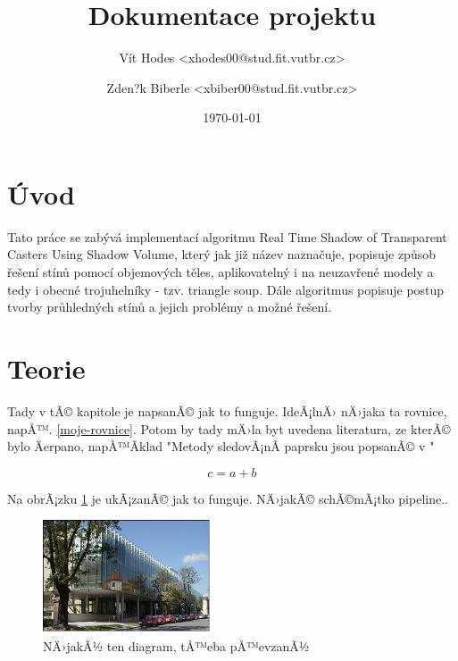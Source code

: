 \documentclass[a4paper, 12pt]{article}
\title{Dokumentace projektu}
\author{Vít Hodes <xhodes00@stud.fit.vutbr.cz>}
\author{Zden?k Biberle <xbiber00@stud.fit.vutbr.cz>}
\date{\today}
\begin{document}
\maketitle

\section{Úvod}


Tato práce se zabývá implementací algoritmu Real Time Shadow of Transparent Casters Using Shadow
Volume, který jak již název naznačuje, popisuje způsob řešení stínů pomocí objemových těles, aplikovatelný i
na neuzavřené modely a tedy i obecné trojuhelníky - tzv. triangle soup. Dále algoritmus popisuje
postup tvorby průhledných stínů a jejich problémy a možné řešení.


\section{Teorie}

Tady v tÃ© kapitole je napsanÃ© jak to funguje. IdeÃ¡lnÄ› nÄ›jaka ta rovnice, napÅ™. \ref{moje-rovnice}. Potom by
tady mÄ›la byt uvedena literatura, ze kterÃ© bylo Äerpano, napÅ™Ã­klad "Metody sledovÃ¡nÃ­ paprsku jsou popsanÃ© v \cite{Byungmoon2007}"


\begin{equation}
  \label{moje-rovnice}
  c = a + b
\end{equation}

Na obrÃ¡zku \ref{fig:obrazek} je ukÃ¡zanÃ© jak to funguje. NÄ›jakÃ© schÃ©mÃ¡tko pipeline..

\begin{figure}[htb]
  \centering
  \includegraphics[width=5cm,keepaspectratio]{obrazek.jpg}
  \caption{NÄ›jakÃ½ ten diagram, tÅ™eba pÅ™evzanÃ½ }
  \label{fig:obrazek}
\end{figure}

\end{document}

